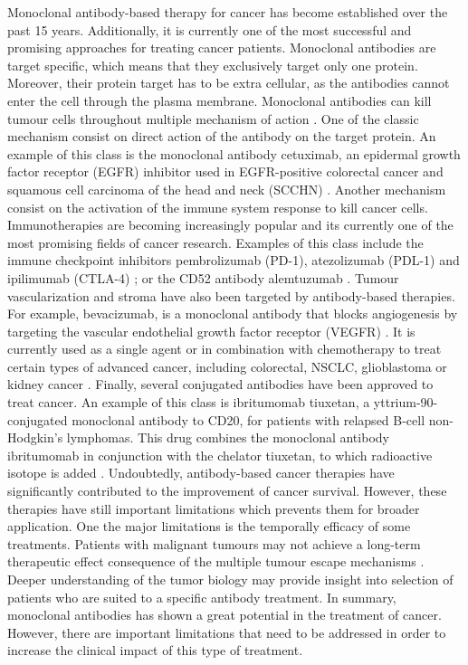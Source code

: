 \documentclass[12pt, a4paper,twoside]{tesi_upf}
\begin{document}
\par  Monoclonal antibody-based therapy for cancer has become established over the past 15 years. Additionally, it is currently one of the most successful and promising approaches for treating cancer patients. Monoclonal antibodies are target specific, which means that they exclusively target only one protein. Moreover, their protein target has to be extra cellular, as the antibodies cannot enter the cell through the plasma membrane. Monoclonal antibodies can kill tumour cells throughout multiple mechanism of action \cite{Scott2012}. One of the classic mechanism consist on direct action of the antibody on the target protein. An example of this class is the monoclonal antibody cetuximab, an epidermal growth factor receptor (EGFR) inhibitor used in EGFR-positive colorectal cancer \cite{Jonker2007} and squamous cell carcinoma of the head and neck (SCCHN) \cite{Tejani2010}. Another mechanism consist on the activation of the immune system response to kill cancer cells. Immunotherapies are becoming increasingly popular and its currently one of the most promising fields of cancer research.  Examples of this class include the immune checkpoint inhibitors  pembrolizumab (PD-1), atezolizumab (PDL-1) and ipilimumab (CTLA-4) \cite{Postow2015}; or the CD52 antibody alemtuzumab \cite{Demko2008}. Tumour vascularization and stroma have also been targeted by antibody-based therapies. For example, bevacizumab, is a monoclonal antibody that blocks angiogenesis by targeting the vascular endothelial growth factor receptor (VEGFR) \cite{Ferrara2004}. It is currently used as a single agent or in combination with chemotherapy to treat certain types of advanced cancer, including colorectal, NSCLC, glioblastoma or kidney cancer \cite{Keating2014}. Finally, several conjugated antibodies have been approved to treat cancer. An example of this class is ibritumomab tiuxetan, a yttrium-90-conjugated monoclonal antibody to CD20, for patients with relapsed B-cell non-Hodgkin's lymphomas. This drug combines the monoclonal antibody ibritumomab in conjunction with the chelator tiuxetan, to which radioactive isotope is added \cite{Witzig2002}. Undoubtedly, antibody-based cancer therapies have significantly contributed to the improvement of cancer survival. However, these therapies have still important limitations which prevents them for broader application. One the major limitations is the temporally efficacy of some treatments. Patients with malignant tumours may not achieve a long-term therapeutic effect consequence of the multiple tumour escape mechanisms \cite{Scott2012}. Deeper understanding of the tumor biology may provide insight into selection of patients who are suited to a specific antibody treatment. In summary, monoclonal antibodies has shown a great potential in the treatment of cancer. However, there are important limitations that need to be addressed in order to increase the clinical impact of this type of treatment.  
\end{document}
